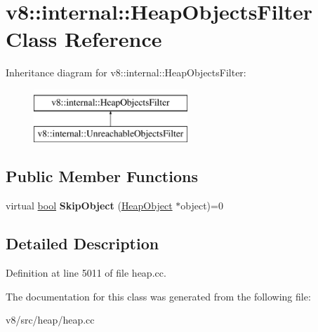 \hypertarget{classv8_1_1internal_1_1HeapObjectsFilter}{}\section{v8\+:\+:internal\+:\+:Heap\+Objects\+Filter Class Reference}
\label{classv8_1_1internal_1_1HeapObjectsFilter}
Inheritance diagram for v8\+:\+:internal\+:\+:Heap\+Objects\+Filter\+:\begin{figure}[H]
\begin{center}
\leavevmode
\includegraphics[height=2.000000cm]{classv8_1_1internal_1_1HeapObjectsFilter}
\end{center}
\end{figure}
\subsection*{Public Member Functions}
\begin{DoxyCompactItemize}
\item 
\mbox{\label{classv8_1_1internal_1_1HeapObjectsFilter_a2f489bb60d2feecea91c232fc8fd23c9}} 
virtual \mbox{\hyperlink{classbool}{bool}} {\bfseries Skip\+Object} (\mbox{\hyperlink{classv8_1_1internal_1_1HeapObject}{Heap\+Object}} $\ast$object)=0
\end{DoxyCompactItemize}


\subsection{Detailed Description}


Definition at line 5011 of file heap.\+cc.



The documentation for this class was generated from the following file\+:\begin{DoxyCompactItemize}
\item 
v8/src/heap/heap.\+cc\end{DoxyCompactItemize}
